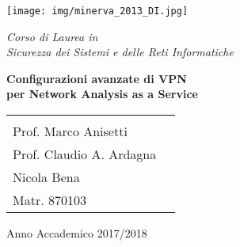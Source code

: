 \documentclass[12pt,fleqn,twoside,a4paper]{book}
\begin{document}

\begin{titlepage}
  \begin{center}
    \texttt{[image: img/minerva\_2013\_DI.jpg]}

    \vspace*{.4cm}
    {\Large
      \emph{Corso di Laurea in\\[.3cm]
        Sicurezza dei Sistemi e delle Reti Informatiche}
    }
    \vfill
    \begin{LARGE}
      \textbf{Configurazioni avanzate di VPN \\[0.4cm]
      per Network Analysis as a Service}
    \end{LARGE}

    \vfill
    \begin{minipage}{.99\linewidth}
      \begin{tabular}{l r}
        \begin{minipage}{.4\linewidth}
          \begin{flushleft}
            {\large
              RELATORE\\[.3cm]
              Prof. Marco Anisetti
            }

            \vspace*{1.5cm}
            {\large
              CORRELATORE\\[.3cm]
              Prof. Claudio A. Ardagna
            }
          \end{flushleft}
        \end{minipage}
        &
        \begin{minipage}{.6\linewidth}
          \begin{flushright}
            {\large
              TESI DI LAUREA DI\\[.3cm]
              Nicola Bena\\[.45cm]
              Matr. 870103
            }
          \end{flushright}
        \end{minipage}
      \end{tabular}
    \end{minipage}

    \vfill
    {\large{{Anno Accademico 2017/2018}}}
  \end{center}
\end{titlepage}


\tableofcontents








\end{document}
